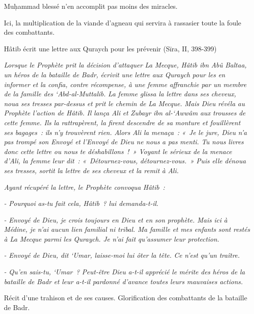 Muḥammad blessé n'en accomplit pas moins des miracles.

Ici, la multiplication de la viande d'agneau qui servira à rassasier
toute la foule des combattants.


Hâtib écrit une lettre aux Quraych pour les prévenir (Sīra, II, 398-399)

\emph{Lorsque le Prophète prit la décision d'attaquer La Mecque, Hâtib
ibn Abû Baltaa, un héros de la bataille de Badr, écrivit une
lettre aux Quraych pour les en informer et la confia, contre récompense,
à une femme affranchie par un membre de la famille des `Abd-al-Muttalib.
La femme glissa la lettre dans ses cheveux, noua ses tresses par-dessus
et prit le chemin de La Mecque. Mais Dieu révéla au Prophète l'action de
Hâtib. Il lança Ali et Zubayr ibn al-`Awwâm aux trousses de cette femme.
Ils la rattrapèrent, la firent descendre de sa monture et fouillèrent
ses bagages~: ils n'y trouvèrent rien. Alors Ali la menaça~: «~Je le
jure, Dieu n'a pas trompé son Envoyé et l'Envoyé de Dieu ne nous a pas
menti. Tu nous livres donc cette lettre ou nous te déshabillons~!~»
Voyant le sérieux de la menace d'Ali, la femme leur dit~:
«~Détournez-vous, détournez-vous.~» Puis elle dénoua ses tresses, sortit
la lettre de ses cheveux et la remit à Ali.}

\emph{Ayant récupéré la lettre, le Prophète convoqua Hâtib~:}

\emph{- Pourquoi as-tu fait cela, Hâtib~? lui demanda-t-il.}

\emph{- Envoyé de Dieu, je crois toujours en Dieu et en son prophète.
Mais ici à Médine, je n'ai aucun lien familial ni tribal. Ma famille et
mes enfants sont restés à La Mecque parmi les Quraych. Je n'ai fait
qu'assumer leur protection.}

\emph{- Envoyé de Dieu, dit `Umar, laisse-moi lui ôter la tête. Ce n'est
qu'un traître.}

\emph{- Qu'en sais-tu, `Umar~? Peut-être Dieu a-t-il apprécié le mérite
des héros de la bataille de Badr et leur a-t-il pardonné d'avance toutes
leurs mauvaises actions.}

Récit d'une trahison et de ses causes. Glorification des combattants de
la bataille de Badr.

